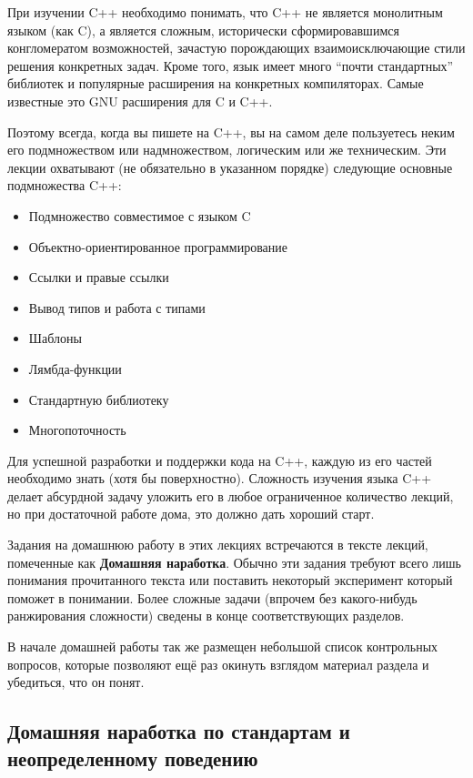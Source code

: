 \documentclass[a4paper,12pt,oneside]{article}
\begin{document}
При изучении C++ необходимо понимать, что C++ не является монолитным языком (как C), а является сложным, исторически сформировавшимся конгломератом возможностей, зачастую порождающих взаимоисключающие стили решения конкретных задач. Кроме того, язык имеет много ``почти стандартных'' библиотек и популярные расширения на конкретных компиляторах. Самые известные это GNU расширения для C и C++. 

Поэтому всегда, когда вы пишете на C++, вы на самом деле пользуетесь неким его подмножеством или надмножеством, логическим или же техническим. Эти лекции охватывают (не обязательно в указанном порядке) следующие основные подмножества C++:

\begin{itemize}
\item
Подмножество совместимое с языком C
\item
Объектно-ориентированное программирование
\item
Ссылки и правые ссылки
\item
Вывод типов и работа с типами
\item
Шаблоны
\item
Лямбда-функции
\item
Стандартную библиотеку
\item
Многопоточность
\end{itemize}

Для успешной разработки и поддержки кода на C++, каждую из его частей необходимо знать (хотя бы поверхностно). Сложность изучения языка C++ делает абсурдной задачу уложить его в любое ограниченное количество лекций, но при достаточной работе дома, это должно дать хороший старт.

Задания на домашнюю работу в этих лекциях встречаются в тексте лекций, помеченные как \textbf{Домашняя наработка}. Обычно эти задания требуют всего лишь понимания прочитанного текста или поставить некоторый эксперимент который поможет в понимании. Более сложные задачи (впрочем без какого-нибудь ранжирования сложности) сведены в конце соответствующих разделов.

В начале домашней работы так же размещен небольшой список контрольных вопросов, которые позволяют ещё раз окинуть взглядом материал раздела и убедиться, что он понят.

\pagebreak
\subsection{Домашняя наработка по стандартам и неопределенному поведению}\label{StandHomework}
\end{document}
